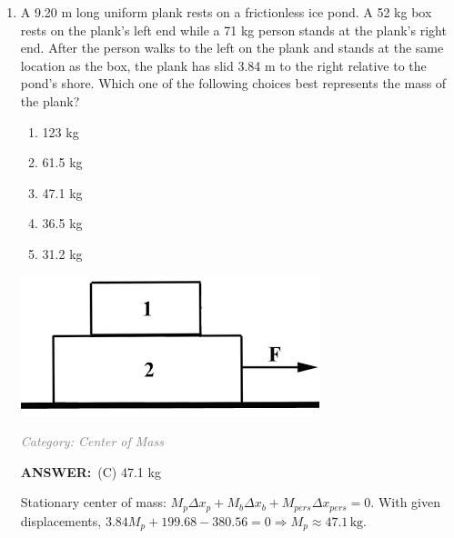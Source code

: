 \documentclass[12pt, a4paper]{article}
\makeatletter
\newcommand{\finalanswer}[1]{\textbf{ANSWER:}~#1}
\newif\if@categoryprinted
\newcommand{\category}[1]{\if@categoryprinted\relax\else\textit{\textcolor{gray}{Category: #1}}\global\@categoryprintedtrue\fi}
\makeatother
\begin{document}
\begin{CJK*}{UTF8}{gbsn}
\begin{enumerate}[itemsep=1.0em, topsep=0.6em]
\item \label{prob:29}
\noindent\begin{minipage}[t]{0.6\linewidth}
\vspace{0pt}
A 9.20 m long uniform plank rests on a frictionless ice pond. A 52 kg box rests on the plank’s left end while a 71 kg person stands at the plank’s right end. After the person walks to the left on the plank and stands at the same location as the box, the plank has slid 3.84 m to the right relative to the pond’s shore. Which one of the following choices best represents the mass of the plank?
\begin{enumerate}[label=(\Alph*)]
    \item 123 kg
    \item 61.5 kg
    \item 47.1 kg
    \item 36.5 kg
    \item 31.2 kg
\end{enumerate}
\end{minipage}%
\hfill
\begin{minipage}[t]{0.35\linewidth}
\vspace{0pt}
\centering
\includegraphics[width=\linewidth]{Problem_31_Figure.png}
\end{minipage}

\category{Center of Mass}
\begin{answerbox}
\finalanswer{(C) 47.1 kg}
\end{answerbox}
\begin{solutionbox}

Stationary center of mass: $M_p\Delta x_p+M_b\Delta x_b+M_{pers}\Delta x_{pers}=0$. With given displacements, $3.84M_p+199.68-380.56=0 \Rightarrow M_p\approx47.1\,\text{kg}$.
\end{solutionbox}


\end{enumerate}
\end{CJK*}
\end{document}
